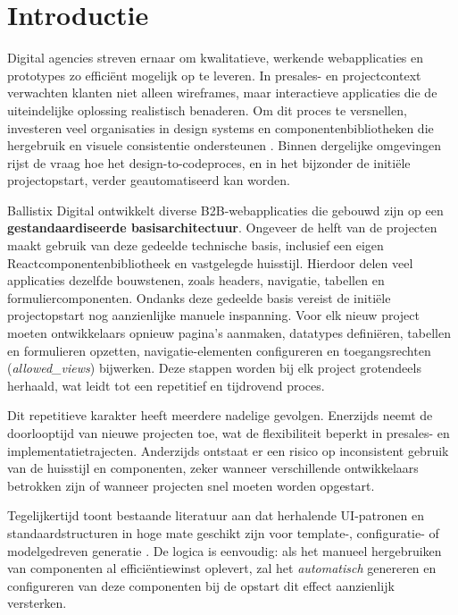 \section{Introductie}

Digital agencies streven ernaar om kwalitatieve, werkende webapplicaties en prototypes zo efficiënt mogelijk op te leveren. In presales- en projectcontext verwachten klanten niet alleen wireframes, maar interactieve applicaties die de uiteindelijke oplossing realistisch benaderen. Om dit proces te versnellen, investeren veel organisaties in design systems en componentenbibliotheken die hergebruik en visuele consistentie ondersteunen \parencite{Godbolt2016}. Binnen dergelijke omgevingen rijst de vraag hoe het design-to-codeproces, en in het bijzonder de initiële projectopstart, verder geautomatiseerd kan worden.

Ballistix Digital ontwikkelt diverse B2B-web\-applicaties die gebouwd zijn op een \textbf{gestandaardiseerde basisarchitectuur}. Ongeveer de helft van de projecten maakt gebruik van deze gedeelde technische basis, inclusief een eigen React\-componentenbibliotheek en vastgelegde huisstijl. Hierdoor delen veel applicaties dezelfde bouwstenen, zoals headers, navigatie, tabellen en formuliercomponenten. Ondanks deze gedeelde basis vereist de initiële projectopstart nog aanzienlijke manuele inspanning. Voor elk nieuw project moeten ontwikkelaars opnieuw pagina's aanmaken, datatypes definiëren, tabellen en formulieren opzetten, navigatie-elementen configureren en toegangsrechten (\emph{allowed\_views}) bijwerken. Deze stappen worden bij elk project grotendeels herhaald, wat leidt tot een repetitief en tijdrovend proces.

Dit repetitieve karakter heeft meerdere nadelige gevolgen. Enerzijds neemt de doorlooptijd van nieuwe projecten toe, wat de flexibiliteit beperkt in presales- en implementatietrajecten. Anderzijds ontstaat er een risico op inconsistent gebruik van de huisstijl en componenten, zeker wanneer verschillende ontwikkelaars betrokken zijn of wanneer projecten snel moeten worden opgestart.

Tegelijkertijd toont bestaande literatuur aan dat herhalende UI-patronen en standaardstructuren in hoge mate geschikt zijn voor template-, configuratie- of modelgedreven generatie \parencite{Nikiforova2025,Nasiri2023,Ourai2025}. De logica is eenvoudig: als het manueel hergebruiken van componenten al efficiëntiewinst oplevert, zal het \emph{automatisch} genereren en configureren van deze componenten bij de opstart dit effect aanzienlijk versterken.

